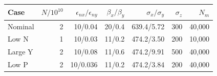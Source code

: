 \begin{tabular}{@{}lrrrrrr@{}}
\toprule
Case & $N/10^{10}$ & $\epsilon_{nx}/\epsilon_{ny}$ & $\beta_x/\beta_y$ & $\sigma_x/\sigma_y$ & $\sigma_z$ & $N_m$\\
\midrule
Nominal & 2 & 10/0.04 & 20/0.4 & 639.4/5.72 & 300 & 40,000\\
Low N & 1 & 10/0.03 & 11/0.2 & 474.2/3.50 & 200 & 10,000\\
Large Y & 2 & 10/0.08 & 11/0.6 & 474.2/9.91 & 500 & 40,000\\
Low P & 2 & 10/0.036 & 11/0.2 & 474.2/3.84 & 200 & 40,000\\
\bottomrule
\end{tabular}
